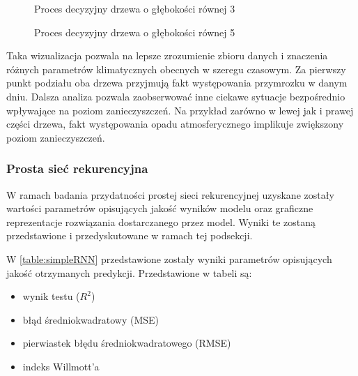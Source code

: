 \documentclass[10pt,a4paper]{article}
\begin{document}
\begin{figure}[!ht]
	\centering
	\caption{Proces decyzyjny drzewa o głębokości równej 3}
	\label{figure:tree_graph_small}
\end{figure}
\FloatBarrier

\begin{figure}[!ht]
	\centering
	\caption{Proces decyzyjny drzewa o głębokości równej 5}
	\label{figure:tree_graph}
\end{figure}
\FloatBarrier
Taka wizualizacja pozwala na lepsze zrozumienie zbioru danych i znaczenia różnych parametrów klimatycznych obecnych w szeregu czasowym. Za pierwszy punkt podziału oba drzewa przyjmują fakt występowania przymrozku w danym dniu. Dalsza analiza pozwala zaobserwować inne ciekawe sytuacje bezpośrednio wpływające na poziom zanieczyszczeń. Na przykład zarówno w lewej jak i prawej części drzewa, fakt występowania opadu atmosferycznego implikuje zwiększony poziom zanieczyszczeń. 

\subsubsection{Prosta sieć rekurencyjna}
\label{subsection:results:simpleRNN}
W ramach badania przydatności prostej sieci rekurencyjnej uzyskane zostały wartości parametrów opisujących jakość wyników modelu oraz graficzne reprezentacje rozwiązania dostarczanego przez model. Wyniki te zostaną przedstawione i przedyskutowane w ramach tej podsekcji.


W \autoref{table:simpleRNN} przedstawione zostały wyniki parametrów opisujących jakość otrzymanych predykcji. Przedstawione w tabeli są:
\begin{center}
	\begin{itemize}
		\item wynik testu ($R^2$)
		\item błąd średniokwadratowy (MSE)
		\item pierwiastek błędu średniokwadratowego (RMSE)
		\item indeks Willmott'a
	\end{itemize}
\end{center}
\end{document}
